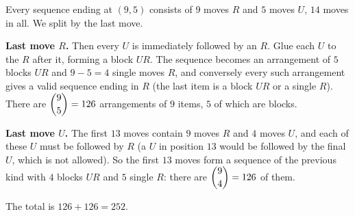 Every sequence ending at $(9,5)$ consists of $9$ moves $R$ and $5$ moves $U$, $14$ moves in all. We split by the last move.

\textbf{Last move $R$.} Then every $U$ is immediately followed by an $R$. Glue each $U$ to the $R$ after it, forming a block $UR$. The sequence becomes an arrangement of $5$ blocks $UR$ and $9-5=4$ single moves $R$, and conversely every such arrangement gives a valid sequence ending in $R$ (the last item is a block $UR$ or a single $R$). There are $\dbinom{9}{5}=126$ arrangements of $9$ items, $5$ of which are blocks.

\textbf{Last move $U$.} The first $13$ moves contain $9$ moves $R$ and $4$ moves $U$, and each of these $U$ must be followed by $R$ (a $U$ in position $13$ would be followed by the final $U$, which is not allowed). So the first $13$ moves form a sequence of the previous kind with $4$ blocks $UR$ and $5$ single $R$: there are $\dbinom{9}{4}=126$ of them.

The total is $126+126=\boxed{252}$.

